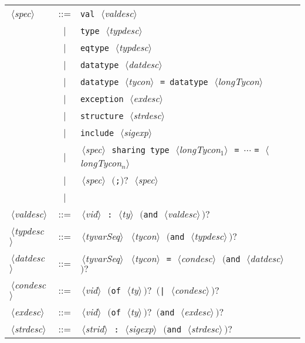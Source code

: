 \documentclass{jbook}
\newcommand{\vbar}{\mbox{\ $|$\ }}
\newcommand{\nonterm}[1]{\mbox{$\,\langle$}{\it #1}\mbox{$\rangle\,$}}
\newcommand{\term}[1]{\mbox{{\tt #1}}}
\newcommand{\optional}[1]{\mbox{$($}{\protect #1}\mbox{$)?$}}
\begin{document}
\begin{center}
\begin{tabular}{lcll}
\nonterm{spec} &::=& 
        \term{val}\ \nonterm{valdesc} \\
&\vbar& \term{type}\ \nonterm{typdesc} \\
&\vbar& \term{eqtype}\  \nonterm{typdesc}\\
&\vbar& \term{datatype}\  \nonterm{datdesc} \\
&\vbar& \term{datatype}\  \nonterm{tycon}\  \term{=}\  \term{datatype}\  \nonterm{longTycon}\\
&\vbar& \term{exception}\  \nonterm{exdesc} \\
&\vbar& \term{structure}\  \nonterm{strdesc}\\
&\vbar&  \term{include}\  \nonterm{sigexp} \\
&\vbar&  \nonterm{spec}\  \term{sharing type}\ \nonterm{longTycon$_1$}\  \term{=}\  $\cdots$ \term{=}\ \nonterm{longTycon$_n$}\\
&\vbar&  \nonterm{spec}\  \optional{\term{;}}\  \nonterm{spec} \\
&\vbar&  &\\
\nonterm{valdesc} &::=& \nonterm{vid}\  \term{:}\  \nonterm{ty}\  \optional{\term{and}\  \nonterm{valdesc}}\\
\nonterm{typdesc} &::=& \nonterm{tyvarSeq}\  \nonterm{tycon}\  \optional{\term{and}\  \nonterm{typdesc}}\\
\nonterm{datdesc} &::=& \nonterm{tyvarSeq}\  \nonterm{tycon}\  \term{=}\  \nonterm{condesc}\   \optional{\term{and}\  \nonterm{datdesc}}\\
\nonterm{condesc} &::=& \nonterm{vid}\  \optional{\term{of}\  \nonterm{ty}}\  \optional{\term{|}\  \nonterm{condesc}}\\
\nonterm{exdesc} &::=& \nonterm{vid}\  \optional{\term{of}\  \nonterm{ty}}\  \optional{\term{and}\  \nonterm{exdesc}}\\
\nonterm{strdesc} &::=& \nonterm{strid}\  \term{:}\  \nonterm{sigexp}\  \optional{\term{and}\  \nonterm{strdesc}}
\end{tabular}
\end{center}
\end{document}

